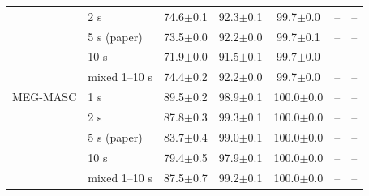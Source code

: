 \begin{tabular}{llccccc}
 & 2 s & 74.6{\scriptsize$\pm$0.1} & 92.3{\scriptsize$\pm$0.1} & 99.7{\scriptsize$\pm$0.0} & -- & -- \\
 & 5 s (paper) & 73.5{\scriptsize$\pm$0.0} & 92.2{\scriptsize$\pm$0.0} & 99.7{\scriptsize$\pm$0.1} & -- & -- \\
 & 10 s & 71.9{\scriptsize$\pm$0.0} & 91.5{\scriptsize$\pm$0.1} & 99.7{\scriptsize$\pm$0.0} & -- & -- \\
 & mixed 1--10 s & 74.4{\scriptsize$\pm$0.2} & 92.2{\scriptsize$\pm$0.0} & 99.7{\scriptsize$\pm$0.0} & -- & -- \\
\midrule
MEG-MASC & 1 s & 89.5{\scriptsize$\pm$0.2} & 98.9{\scriptsize$\pm$0.1} & 100.0{\scriptsize$\pm$0.0} & -- & -- \\
 & 2 s & 87.8{\scriptsize$\pm$0.3} & 99.3{\scriptsize$\pm$0.1} & 100.0{\scriptsize$\pm$0.0} & -- & -- \\
 & 5 s (paper) & 83.7{\scriptsize$\pm$0.4} & 99.0{\scriptsize$\pm$0.1} & 100.0{\scriptsize$\pm$0.0} & -- & -- \\
 & 10 s & 79.4{\scriptsize$\pm$0.5} & 97.9{\scriptsize$\pm$0.1} & 100.0{\scriptsize$\pm$0.0} & -- & -- \\
 & mixed 1--10 s & 87.5{\scriptsize$\pm$0.7} & 99.2{\scriptsize$\pm$0.1} & 100.0{\scriptsize$\pm$0.0} & -- & -- \\
\bottomrule\end{tabular}
